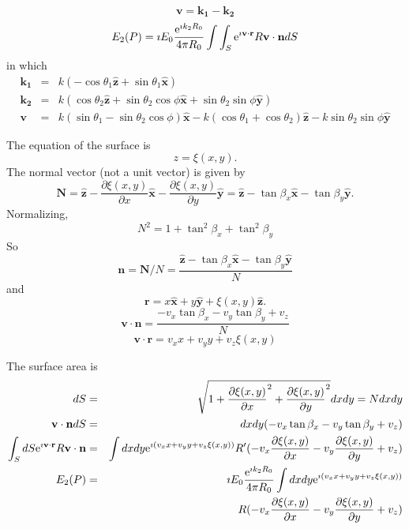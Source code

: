 \documentclass[11pt]{article}
\newcommand{\pder}[2]{\frac{\partial {#1}}{\partial {#2}}}
\newcommand{\e}{{\rm e}}
\newcommand{\bm}[1]{\mathbf{#1}}
\begin{document}
{{{{\begin{equation}
\bm{v}=\bm{k_{1}}-\bm{k_{2}}
  \end{equation}
  \begin{equation}
E_{2}(P)=\imath E_{0}\frac{\e^{\imath k_{2}R_{0}}}{4\pi R_{0}}
\int\int_{S}\e^{\imath\bm{v}\cdot\bm{r}}R\bm{v}\cdot\bm{n}dS
  \end{equation}
in which
  \begin{eqnarray}
\bm{k_{1}} &=& k\left(-\cos{\theta_{1}}\bm{\hat z}+
  \sin{\theta_{1}}\bm{\hat x}\right) \\
\bm{k_{2}} &=& k\left(\cos{\theta_{2}}\bm{\hat z}+
  \sin{\theta_{2}}\cos{\phi}\bm{\hat x}+\sin{\theta_{2}}\sin{\phi}\bm{\hat y}\right) \\
\bm{v} &=& k(\sin{\theta_{1}}-\sin{\theta_{2}}\cos{\phi})\bm{\hat x}-
k(\cos{\theta_{1}}+\cos{\theta_{2}})\bm{\hat z}-k\sin{\theta_{2}}\sin{\phi}\bm{\hat y}
  \end{eqnarray}

The equation of the surface is
  \begin{equation}
z=\xi(x,y).
  \end{equation}
The normal vector (not a unit vector) is given by
  \begin{equation}
\bm{N}=\bm{\hat z}-\pder{\xi(x,y)}{x}\bm{\hat x}-
\pder{\xi(x,y)}{y}\bm{\hat y}=\bm{\hat z}-\tan\beta_{x}\bm{\hat x}-\tan\beta_{y}\bm{\hat y}.
  \end{equation}
Normalizing,
  \begin{equation}
N^{2}=1+\tan^{2}\beta_{x}+\tan^{2}\beta_{y}
  \end{equation}
So
  \begin{equation}
\bm{n}=\bm{N}/N=\frac{\bm{\hat z}-\tan\beta_{x}\bm{\hat x}-\tan\beta_{y}\bm{\hat y}}{N}
  \end{equation}
and
  \begin{equation}
\bm{r}=x\bm{\hat x}+y\bm{\hat y}+\xi(x,y)\bm{\hat z}.
  \end{equation}
  \begin{equation}
\bm{v}\cdot\bm{n}=\frac{-v_{x}\tan{\beta_{x}}-v_{y}\tan{\beta_{y}}+v_{z}}{N}
  \end{equation}
  \begin{equation}
\bm{v}\cdot\bm{r}=v_{x}x+v_{y}y+v_{z}\xi(x,y)
  \end{equation}

The surface area is
  \begin{eqnarray}
dS &=& \sqrt{1+\pder{\xi(x,y)}{x}^{2}+\pder{\xi(x,y)}{y}^{2}}dxdy=Ndxdy \\
\bm{v}\cdot\bm{n}dS &=& dxdy(-v_{x}\tan{\beta_{x}}-v_{y}\tan{\beta_{y}}+v_{z}) \\
\int_{S}dS\e^{\imath\bm{v}\cdot\bm{r}}R\bm{v}\cdot\bm{n} &=&
\int dx dy\e^{\imath( v_{x}x+v_{y}y+v_{z}\xi(x,y))}R'(-v_{x}\pder{\xi(x,y)}{x}-v_{y}\pder{\xi(x,y)}{y}+v_{z}) \\
E_{2}(P) &=& \imath E_{0}\frac{\e^{\imath k_{2}R_{0}}}{4\pi R_{0}}
\int dx dy\e^{\imath( v_{x}x+v_{y}y+v_{z}\xi(x,y))} \\
  && \qquad R(-v_{x}\pder{\xi(x,y)}{x}-v_{y}\pder{\xi(x,y)}{y}+v_{z}) \nonumber
  \end{eqnarray}

}}}}
\end{document}
